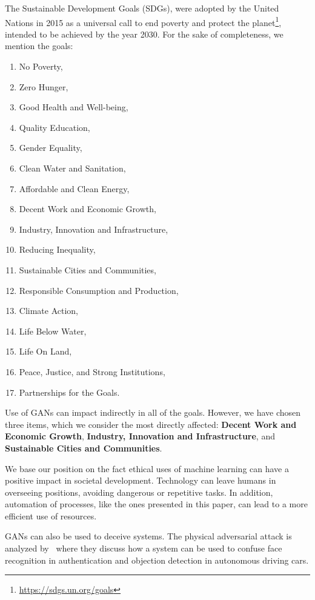 \documentclass[12pt]{article}
\begin{document}
    The Sustainable Development Goals (SDGs), were adopted by the United Nations in 2015 as a universal call
    to end poverty and protect the planet\footnote{\url{https://sdgs.un.org/goals}}, intended to be achieved by the year 2030.
    For the sake of completeness, we mention the goals:
    \begin{enumerate}
        \item No Poverty,
        \item Zero Hunger,
        \item Good Health and Well-being,
        \item Quality Education,
        \item Gender Equality,
        \item Clean Water and Sanitation,
        \item Affordable and Clean Energy,
        \item Decent Work and Economic Growth,
        \item Industry, Innovation and Infrastructure,
        \item Reducing Inequality,
        \item Sustainable Cities and Communities,
        \item Responsible Consumption and Production,
        \item Climate Action,
        \item Life Below Water,
        \item Life On Land,
        \item Peace, Justice, and Strong Institutions,
        \item Partnerships for the Goals.
    \end{enumerate}

    Use of GANs can impact indirectly in all of the goals.
    However, we have chosen three items, which we consider the most directly affected:
    \textbf{Decent Work and Economic Growth}, \textbf{Industry, Innovation and Infrastructure}, and
    \textbf{Sustainable Cities and Communities}.

    We base our position on the fact ethical uses of machine learning can have a positive impact in societal development.
    Technology can leave humans in overseeing positions, avoiding dangerous or repetitive tasks.
    In addition, automation of processes, like the ones presented in this paper, can lead to a more efficient use of resources.

    GANs can also be used to deceive systems.
    The physical adversarial attack is analyzed by~\cite{zhao2019seeing} where they discuss
    how a system can be used to confuse face recognition in authentication and objection detection in autonomous driving cars.
\end{document}

